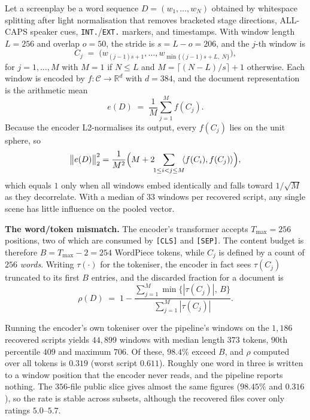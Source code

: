 \documentclass[conference,a4paper]{IEEEtran}
\newcommand{\hlt}[1]{\textbf{#1}}
\begin{document}
Let a screenplay be a word sequence $D = (w_1, \dots, w_N)$ obtained by
whitespace splitting after light normalisation that removes bracketed
stage directions, ALL-CAPS speaker cues, \texttt{INT.}/\texttt{EXT.}
markers, and timestamps. With window length $L = 256$ and overlap
$o = 50$, the stride is $s = L - o = 206$, and the $j$-th window is
\begin{equation}
C_j \;=\; \bigl(w_{(j-1)s+1}, \dots, w_{\min\{(j-1)s+L,\; N\}}\bigr),
\end{equation}
for $j = 1, \dots, M$ with $M = 1$ if $N \le L$ and
$M = \lceil (N - L)/s \rceil + 1$ otherwise. Each window is encoded by
$f: \mathcal{C} \to \mathbb{R}^{d}$ with $d = 384$, and the document
representation is the arithmetic mean
\begin{equation}
\label{eq:meanpool}
e(D) \;=\; \frac{1}{M} \sum_{j=1}^{M} f(C_j) .
\end{equation}
Because the encoder L2-normalises its output, every $f(C_j)$ lies on the
unit sphere, so
\begin{equation}
\label{eq:norm}
\bigl\| e(D) \bigr\|_2^2
= \frac{1}{M^2}\Bigl( M + 2\!\!\sum_{1 \le i < j \le M}\!\!
  \langle f(C_i), f(C_j)\rangle \Bigr),
\end{equation}
which equals $1$ only when all windows embed identically and falls toward
$1/\sqrt{M}$ as they decorrelate. With a median of $33$ windows per
recovered script, any single scene has little influence on the pooled
vector.

\hlt{The word/token mismatch.} The encoder's transformer accepts
$T_{\max} = 256$ positions, two of which are consumed by \texttt{[CLS]}
and \texttt{[SEP]}. The content budget is therefore $B = T_{\max} - 2 =
254$ WordPiece tokens, while $C_j$ is defined by a count of $256$
\emph{words}. Writing $\tau(\cdot)$ for the tokeniser, the encoder in
fact sees $\tau(C_j)$ truncated to its first $B$ entries, and the
discarded fraction for a document is
\begin{equation}
\rho(D) \;=\; 1 - \frac{\sum_{j=1}^{M} \min\bigl\{|\tau(C_j)|,\, B\bigr\}}
                        {\sum_{j=1}^{M} |\tau(C_j)|} .
\end{equation}

Running the encoder's own tokeniser over the pipeline's windows on the
$1{,}186$ recovered scripts yields $44{,}899$ windows with median length
$373$ tokens, $90$th percentile $409$ and maximum $706$. Of these,
$98.4\%$ exceed $B$, and $\rho$ computed over all tokens is $0.319$
(worst script $0.611$). Roughly one word in three is written to a window
position that the encoder never reads, and the pipeline reports nothing.
The $356$-file public slice gives almost the same figures ($98.45\%$ and
$0.316$), so the rate is stable across subsets, although the recovered
files cover only ratings $5.0$--$5.7$.
\end{document}
